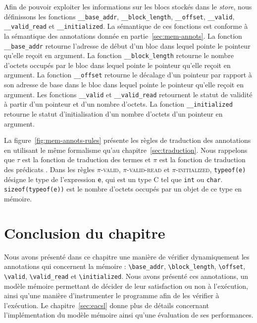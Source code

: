 Afin de pouvoir exploiter les informations sur les blocs stockés dans le
\textit{store}, nous définissons les fonctions \lstinline'__base_addr',
\lstinline'__block_length', \lstinline'__offset', \lstinline'__valid',
\lstinline'__valid_read' et \lstinline'__initialized'.
La sémantique de ces fonctions est conforme à la sémantique des annotations
\eacsl donnée en partie~\ref{sec:mem-annots}.
La fonction \lstinline'__base_addr' retourne l'adresse de début d'un bloc dans
lequel pointe le pointeur qu'elle reçoit en argument.
La fonction \lstinline'__block_length' retourne le nombre d'octets occupés par
le bloc dans lequel pointe le pointeur qu'elle reçoit en argument.
La fonction \lstinline'__offset' retourne le décalage d'un pointeur par rapport
à son adresse de base dans le bloc dans lequel pointe le pointeur qu'elle reçoit
en argument.
Les fonctions \lstinline'__valid' et \lstinline'__valid_read'
retournent le statut de validité à partir d'un pointeur et d'un nombre d'octets.
La fonction \lstinline'__initialized' retourne le statut d'initialisation
d'un nombre d'octets d'un pointeur en argument.

La figure~\ref{fig:mem-annots-rules} présente les règles de traduction des
annotations en utilisant le même formalisme qu'au chapitre~\ref{sec:traduction}.
Nous rappelons que $\tau$ est la fonction de traduction des termes \eacsl et
$\pi$ est la fonction de traduction des prédicats \eacsl.
Dans les règles \textsc{$\pi$-valid}, \textsc{$\pi$-valid-read} et
\textsc{$\pi$-initialized}, \lstinline'typeof(e)' désigne le type de
l'expression \lstinline'e', qui est un type C tel que \lstinline'int' ou
\lstinline'char'.
\lstinline'sizeof(typeof(e))' est le nombre d'octets occupés par un objet
de ce type en mémoire.


\section*{Conclusion du chapitre}


Nous avons présenté dans ce chapitre une manière de vérifier dynamiquement les
annotations \eacsl qui concernent la mémoire : \lstinline'\base_addr',
\lstinline'\block_length', \lstinline'\offset', \lstinline'\valid',
\lstinline'\valid_read' et \lstinline'\initialized'.
Nous avons présenté ces annotations, un modèle mémoire permettant de décider de
leur satisfaction ou non à l'exécution, ainsi qu'une manière d'instrumenter le
programme afin de les vérifier à l'exécution.
Le chapitre~\ref{sec:eacsl} donne plus de détails concernant l'implémentation
du modèle mémoire ainsi qu'une évaluation de ses performances.
